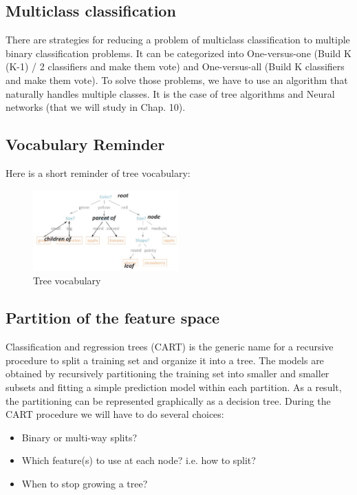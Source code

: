 \documentclass[a4paper,12pt]{article}
\begin{document}
\subsection{Multiclass classification}

There are strategies for reducing a problem of multiclass classification to multiple binary classification problems. It can be categorized into One-versus-one (Build K (K-1) / 2 classifiers and make them vote) and One-versus-all (Build K classifiers and make them vote). To solve those problems, we have to use an algorithm that naturally handles multiple classes. It is the case of tree algorithms and Neural networks (that we will study in Chap. 10).\\

\subsection{Vocabulary Reminder}
Here is a short reminder of tree vocabulary:\\
\begin{figure}[h]
  \centering
  \includegraphics[width=0.5\textwidth]{figures/s1.jpg}
  \caption{Tree vocabulary}
  \label{fig:ensemble learning}
\end{figure}
\subsection{Partition of the feature space}

Classification and regression trees (CART) is the generic name for a recursive procedure to split a training set and organize it into a tree. The models are obtained by recursively partitioning
the training set into smaller and smaller subsets and fitting a simple prediction model within each partition. As a result, the partitioning can be represented graphically as a decision tree. During the CART procedure we will have to do several choices: 
\begin{itemize}
\item Binary or multi-way splits?
\item Which feature(s) to use at each node? i.e. how to split?
\item When to stop growing a tree?

\end{itemize}
\end{document}
